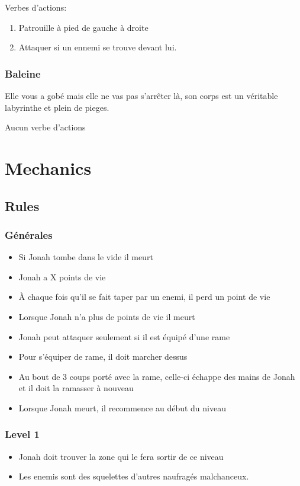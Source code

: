 \documentclass{prologArticle}
\begin{document}
Verbes d'actions:
\begin{enumerate}
    \item Patrouille à pied de gauche à droite
    \item Attaquer si un ennemi se trouve devant lui.
\end{enumerate}

\subsubsection{Baleine}
Elle vous a gobé mais elle ne vas pas s'arrêter là, son corps est un véritable labyrinthe et plein de pieges.

Aucun verbe d'actions

\section{Mechanics}

\subsection{Rules}

\subsubsection{Générales}
\begin{itemize}
    \item Si Jonah tombe dans le vide il meurt
    \item Jonah a X points de vie %
    \item À chaque fois qu'il se fait taper par un enemi, il perd un point de vie
    \item Lorsque Jonah n'a plus de points de vie il meurt
    \item Jonah peut attaquer seulement si il est équipé d'une rame
    \item Pour s'équiper de rame, il doit marcher dessus
    \item Au bout de 3 coups porté avec la rame, celle-ci échappe des mains de Jonah et il doit la ramasser à nouveau
    \item Lorsque Jonah meurt, il recommence au début du niveau
\end{itemize}

\subsubsection{Level 1}
\begin{itemize}
    \item Jonah doit trouver la zone qui le fera sortir de ce niveau
    \item Les enemis sont des squelettes d'autres naufragés malchanceux.
\end{itemize}
\end{document}
